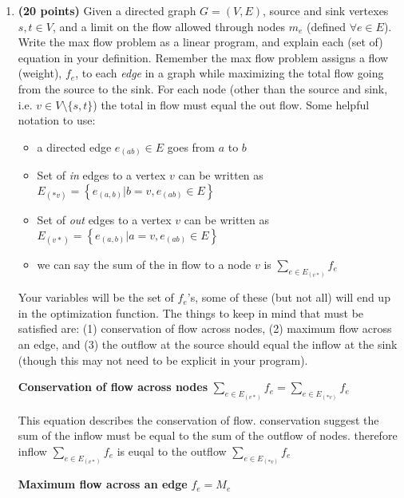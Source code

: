 \documentclass[11pt, oneside]{article}
\begin{document}
\begin{enumerate}
	\item \textbf{(20 points)}
	      Given a directed graph $G = (V,E)$, source and sink vertexes $s,t\in V$, and a limit on the flow allowed through nodes $m_e$ (defined $\forall e\in E$).
	      Write the max flow problem as a linear program, and explain each (set of) equation in your definition.
	      Remember the max flow problem assigns a flow (weight), $f_e$, to each \emph{edge} in a graph
	      while maximizing the total flow going from the source to the sink.
	      For each node (other than the source and sink, i.e. $v\in V\setminus\{s,t\}$)
	      the total in flow must equal the out flow.
	      Some helpful notation to use:
	      \begin{itemize}
		      \item a directed edge $e_{(ab)}\in E$ goes from $a$ to $b$
		      \item Set of \emph{in} edges to a vertex $v$  can be written as $E_{(*v)} = \left\{e_{(a,b)} | b = v,  e_{(ab)}\in E \right\}$
		      \item Set of \emph{out} edges to a vertex $v$  can be written as $E_{(v*)} = \left\{e_{(a,b)} | a = v, e_{(ab)}\in E\right\}$
		      \item we can say the sum of the in flow to a node $v$ is $\displaystyle\sum_{e \in E_{(v*)}} f_e$
	      \end{itemize}
	      Your variables will be the set of $f_e$'s, some of these (but not all) will end up in the optimization function.
	      The things to keep in mind that must be satisfied are:
	      (1) conservation of flow across nodes,
	      (2) maximum flow across an edge, and
	      (3) the outflow at the source should equal the inflow at the sink (though this may not need to be explicit in your program).

	\begin{center}
	\textbf{Conservation of flow across nodes}
	\linebreak
	\linebreak
	$\displaystyle\sum_{e \in E_{(v*)}}f_e = \displaystyle\sum_{e \in E_{(*v)}}f_e$ \end{center}

	This equation describes the conservation of flow. conservation suggest the sum of the inflow must be equal to the sum of the outflow of nodes. therefore inflow $\displaystyle\sum_{e \in E_{(v*)}}f_e$ is euqal to the outflow $\displaystyle\sum_{e \in E_{(*v)}}f_e$
		\pagebreak
	\begin{center}
		\textbf{Maximum flow across an edge}
		\linebreak
		\linebreak
		$f_e = M_e$ 
	\end{center}


\end{enumerate}
\end{document}
